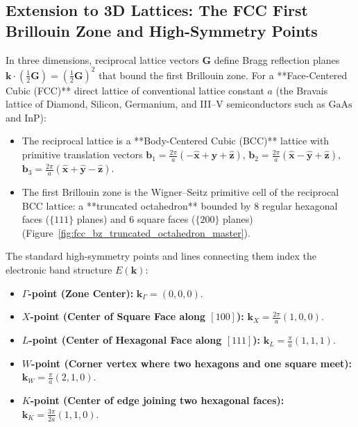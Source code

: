 \documentclass[11pt,a4paper]{article}
\newcommand{\vb}[1]{\mathbf{#1}}
\newcommand{\kk}{\mathbf{k}}
\newcommand{\GG}{\mathbf{G}}
\begin{document}
\subsection{Extension to 3D Lattices: The FCC First Brillouin Zone and High-Symmetry Points}
In three dimensions, reciprocal lattice vectors $\GG$ define Bragg reflection planes $\kk \cdot \left(\frac{1}{2}\GG\right) = \left(\frac{1}{2}\GG\right)^2$ that bound the first Brillouin zone. For a **Face-Centered Cubic (FCC)** direct lattice of conventional lattice constant $a$ (the Bravais lattice of Diamond, Silicon, Germanium, and III--V semiconductors such as $\text{GaAs}$ and $\text{InP}$):
\begin{itemize}
    \item The reciprocal lattice is a **Body-Centered Cubic (BCC)** lattice with primitive translation vectors $\vb{b}_1 = \frac{2\pi}{a}(-\hat{\vb{x}}+\hat{\vb{y}}+\hat{\vb{z}})$, $\vb{b}_2 = \frac{2\pi}{a}(\hat{\vb{x}}-\hat{\vb{y}}+\hat{\vb{z}})$, $\vb{b}_3 = \frac{2\pi}{a}(\hat{\vb{x}}+\hat{\vb{y}}-\hat{\vb{z}})$.
    \item The first Brillouin zone is the Wigner--Seitz primitive cell of the reciprocal BCC lattice: a **truncated octahedron** bounded by $8$ regular hexagonal faces ($\{111\}$ planes) and $6$ square faces ($\{200\}$ planes) (Figure~\ref{fig:fcc_bz_truncated_octahedron_master}).
\end{itemize}
The standard high-symmetry points and lines connecting them index the electronic band structure $E(\kk)$:
\begin{itemize}
    \item \textbf{$\Gamma$-point (Zone Center):} $\kk_\Gamma = (0, 0, 0)$.
    \item \textbf{$X$-point (Center of Square Face along $[100]$):} $\kk_X = \frac{2\pi}{a}(1, 0, 0)$.
    \item \textbf{$L$-point (Center of Hexagonal Face along $[111]$):} $\kk_L = \frac{\pi}{a}(1, 1, 1)$.
    \item \textbf{$W$-point (Corner vertex where two hexagons and one square meet):} $\kk_W = \frac{\pi}{a}(2, 1, 0)$.
    \item \textbf{$K$-point (Center of edge joining two hexagonal faces):} $\kk_K = \frac{3\pi}{2a}(1, 1, 0)$.
\end{itemize}
\end{document}
